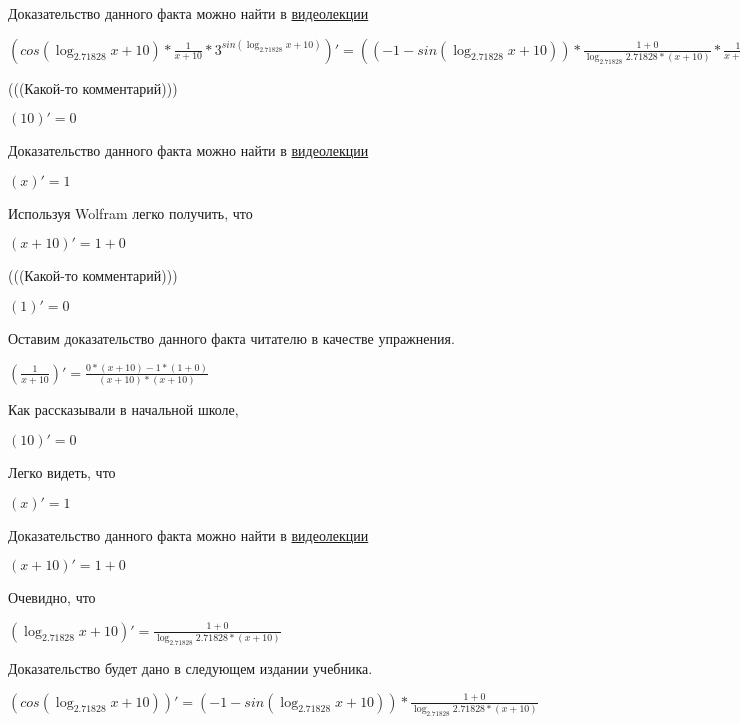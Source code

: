 \documentclass[12pt,a4paper,fleqn]{article}
\theoremstyle{definition}
\begin{document}
Доказательство данного факта можно найти в \href{https://www.youtube.com/watch?v=dQw4w9WgXcQ}{видеолекции}

$(cos(\log_{ 2.71828 }{ x  +  10 }) * \frac{ 1 }{ x  +  10 }
 * { 3 }^{sin(\log_{ 2.71828 }{ x  +  10 })})' = (( -1  - sin(\log_{ 2.71828 }{ x  +  10 })) * \frac{ 1  +  0 }{\log_{ 2.71828 }{ 2.71828 } * ( x  +  10 )}
 * \frac{ 1 }{ x  +  10 }
 + cos(\log_{ 2.71828 }{ x  +  10 }) * \frac{ 0  * ( x  +  10 ) -  1  * ( 1  +  0 )}{( x  +  10 ) * ( x  +  10 )}
) * { 3 }^{sin(\log_{ 2.71828 }{ x  +  10 })} + cos(\log_{ 2.71828 }{ x  +  10 }) * \frac{ 1 }{ x  +  10 }
 * \log_{ 2.71828 }{ 3 } * cos(\log_{ 2.71828 }{ x  +  10 }) * \frac{ 1  +  0 }{\log_{ 2.71828 }{ 2.71828 } * ( x  +  10 )}
 * { 3 }^{sin(\log_{ 2.71828 }{ x  +  10 })}$

(((Какой-то комментарий)))

$( 10 )' =  0 $

Доказательство данного факта можно найти в \href{https://www.youtube.com/watch?v=dQw4w9WgXcQ}{видеолекции}

$( x )' =  1 $

Используя Wolfram легко получить, что

$( x  +  10 )' =  1  +  0 $

(((Какой-то комментарий)))

$( 1 )' =  0 $

Оставим доказательство данного факта читателю в качестве упражнения.

$(\frac{ 1 }{ x  +  10 }
)' = \frac{ 0  * ( x  +  10 ) -  1  * ( 1  +  0 )}{( x  +  10 ) * ( x  +  10 )}
$

Как рассказывали в начальной школе,

$( 10 )' =  0 $

Легко видеть, что

$( x )' =  1 $

Доказательство данного факта можно найти в \href{https://www.youtube.com/watch?v=dQw4w9WgXcQ}{видеолекции}

$( x  +  10 )' =  1  +  0 $

Очевидно, что

$(\log_{ 2.71828 }{ x  +  10 })' = \frac{ 1  +  0 }{\log_{ 2.71828 }{ 2.71828 } * ( x  +  10 )}
$

Доказательство будет дано в следующем издании учебника.

$(cos(\log_{ 2.71828 }{ x  +  10 }))' = ( -1  - sin(\log_{ 2.71828 }{ x  +  10 })) * \frac{ 1  +  0 }{\log_{ 2.71828 }{ 2.71828 } * ( x  +  10 )}
$
\end{document}
